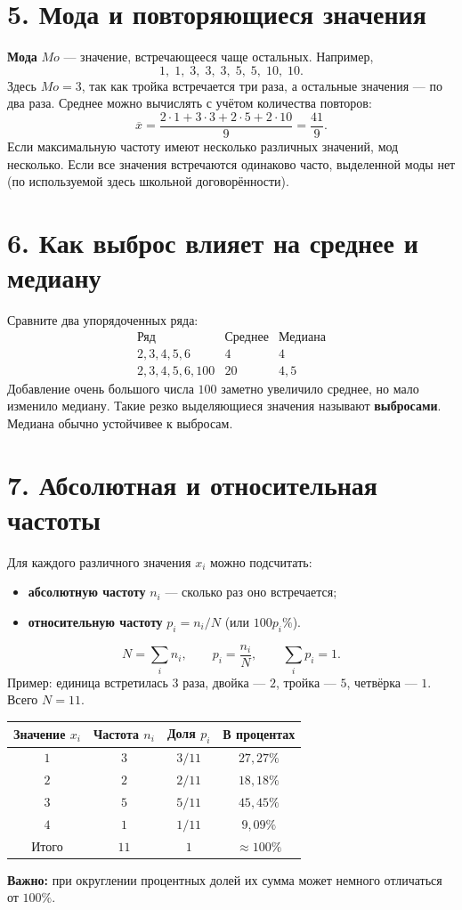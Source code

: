 \documentclass[a4paper,12pt]{article}
\newcommand{\key}[1]{\textcolor{darkaccent}{\textbf{#1}}}
\newcommand{\mysection}[1]{\vspace{5pt}\section*{\textcolor{darkaccent}{#1}}\vspace{-5pt}}
\newcommand{\xbar}{\overline{x}}
\begin{document}
\mysection{5. Мода и повторяющиеся значения}
\key{Мода} $Mo$ --- значение, встречающееся чаще остальных. Например,
\[
1,\;1,\;3,\;3,\;3,\;5,\;5,\;10,\;10.
\]
Здесь $Mo=3$, так как тройка встречается три раза, а остальные значения --- по два раза. Среднее можно вычислять с учётом количества повторов:
\[
\xbar=\frac{2\cdot1+3\cdot3+2\cdot5+2\cdot10}{9}=\frac{41}{9}.
\]
Если максимальную частоту имеют несколько различных значений, мод несколько. Если все значения встречаются одинаково часто, выделенной моды нет (по используемой здесь школьной договорённости).

\mysection{6. Как выброс влияет на среднее и медиану}
Сравните два упорядоченных ряда:
\[
\begin{array}{c|c|c}
\text{Ряд} & \text{Среднее} & \text{Медиана}\\ \hline
2,3,4,5,6 & 4 & 4\\
2,3,4,5,6,100 & 20 & 4{,}5
\end{array}
\]
Добавление очень большого числа $100$ заметно увеличило среднее, но мало изменило медиану. Такие резко выделяющиеся значения называют \key{выбросами}. Медиана обычно устойчивее к выбросам.

\clearpage
\mysection{7. Абсолютная и относительная частоты}
Для каждого различного значения $x_i$ можно подсчитать:
\begin{itemize}
\item \key{абсолютную частоту} $n_i$ --- сколько раз оно встречается;
\item \key{относительную частоту} $p_i=n_i/N$ (или $100p_i\%$).
\end{itemize}
\[
\boxed{\displaystyle N=\sum_i n_i,\qquad p_i=\frac{n_i}{N},\qquad \sum_i p_i=1.}
\]
Пример: единица встретилась $3$ раза, двойка --- $2$, тройка --- $5$, четвёрка --- $1$. Всего $N=11$.
\begin{center}
\renewcommand{\arraystretch}{1.27}
\begin{tabular}{@{}c c c c@{}}
\toprule
Значение $x_i$ & Частота $n_i$ & Доля $p_i$ & В процентах\\
\midrule
$1$ & $3$ & $3/11$ & $27{,}27\%$\\
$2$ & $2$ & $2/11$ & $18{,}18\%$\\
$3$ & $5$ & $5/11$ & $45{,}45\%$\\
$4$ & $1$ & $1/11$ & $9{,}09\%$\\
\midrule
Итого & $11$ & $1$ & $\approx100\%$\\
\bottomrule
\end{tabular}
\end{center}
\textbf{Важно:} при округлении процентных долей их сумма может немного отличаться от $100\%$.
\end{document}
